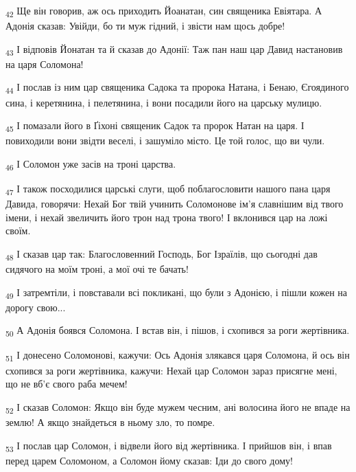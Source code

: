 \begin{tcolorbox}
\textsubscript{42} Ще він говорив, аж ось приходить Йоанатан, син священика Евіятара. А Адонія сказав: Увійди, бо ти муж гідний, і звісти нам щось добре!
\end{tcolorbox}
\begin{tcolorbox}
\textsubscript{43} І відповів Йонатан та й сказав до Адонії: Таж пан наш цар Давид настановив на царя Соломона!
\end{tcolorbox}
\begin{tcolorbox}
\textsubscript{44} І послав із ним цар священика Садока та пророка Натана, і Бенаю, Єгоядиного сина, і керетянина, і пелетянина, і вони посадили його на царську мулицю.
\end{tcolorbox}
\begin{tcolorbox}
\textsubscript{45} І помазали його в Ґіхоні священик Садок та пророк Натан на царя. І повиходили вони звідти веселі, і зашуміло місто. Це той голос, що ви чули.
\end{tcolorbox}
\begin{tcolorbox}
\textsubscript{46} І Соломон уже засів на троні царства.
\end{tcolorbox}
\begin{tcolorbox}
\textsubscript{47} І також посходилися царські слуги, щоб поблагословити нашого пана царя Давида, говорячи: Нехай Бог твій учинить Соломонове ім'я славнішим від твого імени, і нехай звеличить його трон над трона твого! І вклонився цар на ложі своїм.
\end{tcolorbox}
\begin{tcolorbox}
\textsubscript{48} І сказав цар так: Благословенний Господь, Бог Ізраїлів, що сьогодні дав сидячого на моїм троні, а мої очі те бачать!
\end{tcolorbox}
\begin{tcolorbox}
\textsubscript{49} І затремтіли, і повставали всі покликані, що були з Адонією, і пішли кожен на дорогу свою...
\end{tcolorbox}
\begin{tcolorbox}
\textsubscript{50} А Адонія боявся Соломона. І встав він, і пішов, і схопився за роги жертівника.
\end{tcolorbox}
\begin{tcolorbox}
\textsubscript{51} І донесено Соломонові, кажучи: Ось Адонія злякався царя Соломона, й ось він схопився за роги жертівника, кажучи: Нехай цар Соломон зараз присягне мені, що не вб'є свого раба мечем!
\end{tcolorbox}
\begin{tcolorbox}
\textsubscript{52} І сказав Соломон: Якщо він буде мужем чесним, ані волосина його не впаде на землю! А якщо знайдеться в ньому зло, то помре.
\end{tcolorbox}
\begin{tcolorbox}
\textsubscript{53} І послав цар Соломон, і відвели його від жертівника. І прийшов він, і впав перед царем Соломоном, а Соломон йому сказав: Іди до свого дому!
\end{tcolorbox}

